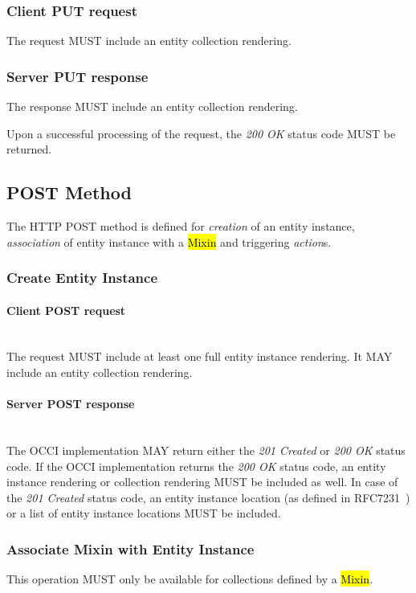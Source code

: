 \documentclass[10pt,a4paper]{article}
\begin{document}
\subsubsection*{Client PUT request}
The request MUST include an entity collection rendering.

\subsubsection*{Server PUT response}
The response MUST include an entity collection rendering.

Upon a successful processing of the request, the \emph{200 OK} status code MUST be returned.

\subsection{POST Method}
The HTTP POST method is defined for {\em creation} of an entity instance, {\em association}
of entity instance with a \hl{Mixin} and triggering {\em action}s.

\subsubsection{Create Entity Instance}

\paragraph*{Client POST request}\hfill\\
The request MUST include at least one full entity instance rendering.
It MAY include an entity collection rendering.

\paragraph*{Server POST response}\hfill\\
The OCCI implementation MAY return either the \emph{201 Created} or \emph{200 OK} status code. If the OCCI implementation
returns the \emph{200 OK} status code, an entity instance rendering or collection rendering MUST be included as well.
In case of the \emph{201 Created} status code, an entity instance location (as defined in RFC7231~\cite{rfc7231})
or a list of entity instance locations MUST be included.

\subsubsection{Associate Mixin with Entity Instance}
This operation MUST only be available for collections defined by a \hl{Mixin}.
\end{document}
